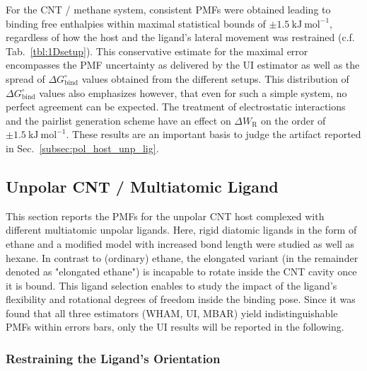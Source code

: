 \documentclass[9pt,lessons]{livecoms}
\begin{document}
For the CNT / methane system, consistent PMFs were obtained leading to binding free enthalpies within maximal statistical bounds of 
$\pm 1.5~\mathrm{kJ}~\mathrm{mol}^{-1}$, regardless of how the host and the ligand's lateral movement was restrained (c.f. Tab.~\ref{tbl:1Dsetup}).
This conservative estimate for the maximal error encompasses the PMF uncertainty as delivered by the UI estimator as well as the spread of $\Delta G^\circ_\mathrm{bind}$ values obtained from the different setups. 
This distribution of $\Delta G^\circ_\mathrm{bind}$ values also emphasizes however, that even for such a simple system, no perfect agreement can be expected.
The treatment of electrostatic interactions and the pairlist generation scheme have an effect on $\Delta W_\mathrm{R}$ on the order of $\pm 1.5~\mathrm{kJ}~\mathrm{mol}^{-1}$.
These results are an important basis to judge the artifact reported in Sec.~\ref{subsec:pol_host_unp_lig}. 


\subsection{Unpolar CNT / Multiatomic Ligand}
\label{subsec:unp_host_unp_lig}

This section reports the PMFs for the unpolar CNT host complexed with different multiatomic unpolar ligands.
Here, rigid diatomic ligands in the form of ethane and a modified model with increased bond length were studied as well as hexane.
In contrast to (ordinary) ethane, the elongated variant (in the remainder denoted as "elongated ethane")  is incapable to rotate inside the CNT cavity once it is bound.
This ligand selection enables to study the impact of the ligand's flexibility and rotational degrees of freedom inside the binding pose. 
Since it was found that all three estimators (WHAM, UI, MBAR) yield indistinguishable PMFs within errors bars, only the UI results will be reported in the following.


\subsubsection*{Restraining the Ligand's Orientation}
\label{subsubsec:orirest}
\end{document}
